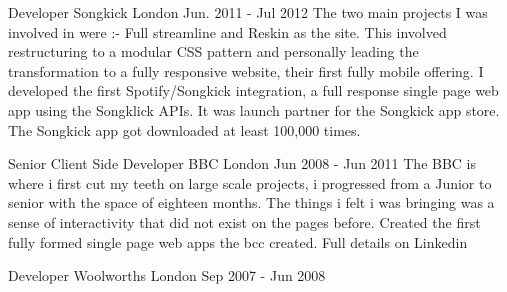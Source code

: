 \begin{cventries}
    \cventry
    {Developer} %
    {Songkick} %
    {London} %
    {Jun. 2011 - Jul 2012} %
    {
      The two main projects I was involved in were :-
      \newline
      \vspace{0.25cm}
      Full streamline and Reskin as the site. This involved restructuring to a modular CSS pattern and personally leading the transformation to a fully responsive website, their first fully mobile offering.
      \newline
      \vspace{0.25cm}
      I developed the first Spotify/Songkick integration, a full response single page web app using the Songklick APIs. It was launch partner for the Songkick app store. The Songkick app got downloaded at least 100,000 times.
      \vspace{0.25cm}
    }

    \cventry
    {Senior Client Side Developer} %
    {BBC} %
    {London} %
    {Jun 2008 - Jun 2011} %
    {
      The BBC is where i first cut my teeth on large scale projects, i progressed from a Junior to senior with the space of eighteen months. The things i felt i was bringing was a sense of interactivity that did not exist on the pages before.
      Created the first fully formed single page web apps the bcc created. Full details on Linkedin
      \newline
      \vspace{0.25cm}
    }

    \cventry
    {Developer} %
    {Woolworths} %
    {London} %
    {Sep 2007 - Jun 2008} %
    {}



\end{cventries}
